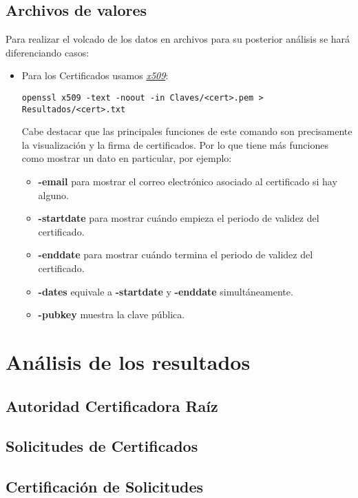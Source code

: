 \documentclass[a4paper, 11pt]{article}
\begin{document}
	\subsection{Archivos de valores}
		Para realizar el volcado de los datos en archivos para su posterior análisis se hará diferenciando casos:
		\begin{itemize}
			\item Para los Certificados usamos \href{https://www.openssl.org/docs/man1.0.2/apps/x509.html}{\textit{x509}}:
			\begin{small}
				\verb|openssl x509 -text -noout -in Claves/<cert>.pem > Resultados/<cert>.txt|\\
			\end{small}
			
			Cabe destacar que las principales funciones de este comando son precisamente la visualización y la firma de
			certificados. Por lo que tiene más funciones como mostrar un dato en particular, por ejemplo:
			\begin{itemize}
				\item \textbf{-email} para mostrar el correo electrónico asociado al certificado si hay alguno.
				\item \textbf{-startdate} para mostrar cuándo empieza el periodo de validez del certificado.
				\item \textbf{-enddate} para mostrar cuándo termina el periodo de validez del certificado.
				\item \textbf{-dates} equivale a \textbf{-startdate} y \textbf{-enddate} simultáneamente.
				\item \textbf{-pubkey} muestra la clave pública.
			\end{itemize}
		\end{itemize}
		
\section{Análisis de los resultados}
	\subsection{Autoridad Certificadora Raíz}
	\subsection{Solicitudes de Certificados}
	\subsection{Certificación de Solicitudes}
	
\end{document}
